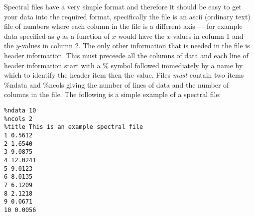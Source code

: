 Spectral files have a very simple format and therefore it should be easy
to get your data into the required format, specifically the file is an
ascii (ordinary text) file of numbers where each column in the file is
a different axis --- for example data specified as $y$ as a function of
$x$ would have the $x$-values in column 1 and the $y$-values in column 2.
The only other information that is needed in the file is header information.
This must preceede all the columns of data and each line of header information
start with a \% symbol followed immediately by a name by which to
identify the header item then the value.  Files {\em must} contain two
items \%ndata and \%ncols giving the number of lines of data and the
number of columns in the file.  The following is a simple example of a
spectral file:
\begin{verbatim}
%ndata 10
%ncols 2
%title This is an example spectral file
1 0.5612
2 1.6540
3 9.0875
4 12.0241
5 9.0123
6 8.0135
7 6.1209
8 2.1218
9 0.0671
10 0.0056
\end{verbatim}

 
 
 
 
 
 
 
 
 
 
 
 
 
 
 
 
 
 
 
 
 
 
 
 
 
 
 
 
 
 
 
 
 
 
 
 
 
 
 
 
 
 
 
 
 
 
 
 
 

